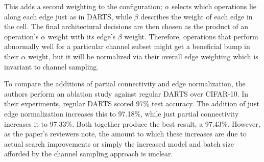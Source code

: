 This adds a second weighting to the configuration; $\alpha$ selects which operations lie along each edge just as in
DARTS, while $\beta$ describes the weight of each edge in the cell. The final architectural decisions are then
chosen as the product of an operation's $\alpha$ weight with its edge's $\beta$ weight. Therefore, operations that
 perform abnormally well for a particular channel subset might get a beneficial bump in their $\alpha$ weight, but it will
be normalized via their overall edge weighting which is invariant to channel sampling.

To compare the additions of partial connectivity and edge normalization, the authors perform an ablation study against
regular DARTS over CIFAR-10. In their experiments, regular DARTS scored 97\% test accuracy. The addition of just
edge normalization increases this to 97.18\%, while just partial connectivity increases it to 97.33\%. Both together
produce the best result, a 97.43\%. However, as the paper's reviewers note, the amount to which these increases are due
to actual search improvements or simply the increased model and batch size afforded by the channel sampling approach is
unclear.


